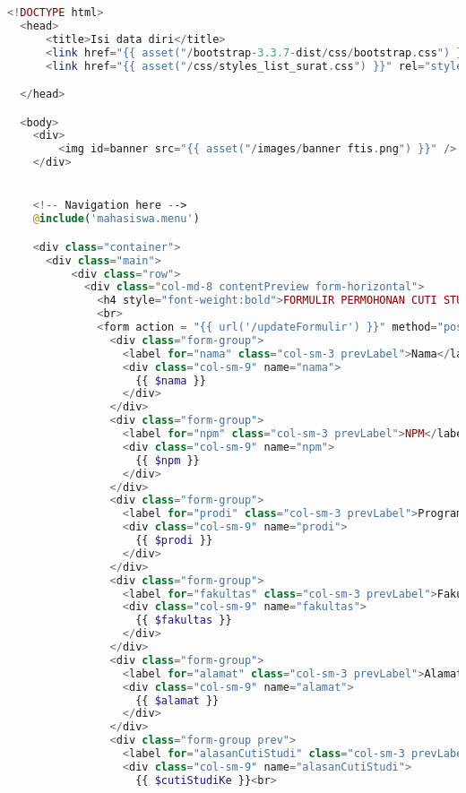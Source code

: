 \begin{lstlisting}[language=php,basicstyle=\tiny,caption=\textit{Preview} isi persetujuan dan catatan]
	<!DOCTYPE html>
  <head>
      <title>Isi data diri</title>
      <link href="{{ asset("/bootstrap-3.3.7-dist/css/bootstrap.css") }}" rel="stylesheet" type="text/css" />
      <link href="{{ asset("/css/styles_list_surat.css") }}" rel="stylesheet" type="text/css">

  </head>

  <body>
    <div>
        <img id=banner src="{{ asset("/images/banner ftis.png") }}" />
    </div>


    <!-- Navigation here -->
    @include('mahasiswa.menu')

    <div class="container">
      <div class="main">
          <div class="row">
            <div class="col-md-8 contentPreview form-horizontal">
              <h4 style="font-weight:bold">FORMULIR PERMOHONAN CUTI STUDI</h4>
              <br>
              <form action = "{{ url('/updateFormulir') }}" method="post">
                <div class="form-group">
                  <label for="nama" class="col-sm-3 prevLabel">Nama</label>
                  <div class="col-sm-9" name="nama">
                    {{ $nama }}
                  </div>
                </div>
                <div class="form-group">
                  <label for="npm" class="col-sm-3 prevLabel">NPM</label>
                  <div class="col-sm-9" name="npm">
                    {{ $npm }}
                  </div>
                </div>
                <div class="form-group">
                  <label for="prodi" class="col-sm-3 prevLabel">Program Studi</label>
                  <div class="col-sm-9" name="prodi">
                    {{ $prodi }}
                  </div>
                </div>
                <div class="form-group">
                  <label for="fakultas" class="col-sm-3 prevLabel">Fakultas</label>
                  <div class="col-sm-9" name="fakultas">
                    {{ $fakultas }}
                  </div>
                </div>
                <div class="form-group">
                  <label for="alamat" class="col-sm-3 prevLabel">Alamat</label>
                  <div class="col-sm-9" name="alamat">
                    {{ $alamat }}
                  </div>
                </div>
                <div class="form-group prev">
                  <label for="alasanCutiStudi" class="col-sm-3 prevLabel">Alasan cuti studi ke </label>
                  <div class="col-sm-9" name="alasanCutiStudi">
                    {{ $cutiStudiKe }}<br>

\end{lstlisting}
